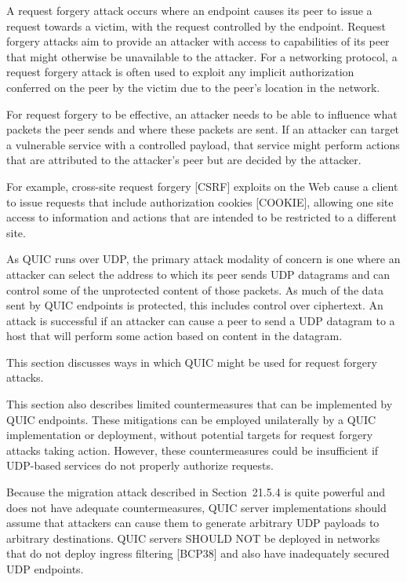 \documentclass{article}
\begin{document}
A request forgery attack occurs where an endpoint causes its peer to issue a request towards a victim, with the request controlled by the endpoint.  Request forgery attacks aim to provide an attacker with access to capabilities of its peer that might otherwise be unavailable to the attacker.  For a networking protocol, a request forgery attack is often used to exploit any implicit authorization conferred on the peer by the victim due to the peer's location in the network.

For request forgery to be effective, an attacker needs to be able to influence what packets the peer sends and where these packets are sent.  If an attacker can target a vulnerable service with a controlled payload, that service might perform actions that are attributed to the attacker's peer but are decided by the attacker.

For example, cross-site request forgery [CSRF] exploits on the Web cause a client to issue requests that include authorization cookies [COOKIE], allowing one site access to information and actions that are intended to be restricted to a different site.

As QUIC runs over UDP, the primary attack modality of concern is one where an attacker can select the address to which its peer sends UDP datagrams and can control some of the unprotected content of those packets.  As much of the data sent by QUIC endpoints is protected, this includes control over ciphertext.  An attack is successful if an attacker can cause a peer to send a UDP datagram to a host that will perform some action based on content in the datagram.

This section discusses ways in which QUIC might be used for request forgery attacks.

This section also describes limited countermeasures that can be implemented by QUIC endpoints.  These mitigations can be employed unilaterally by a QUIC implementation or deployment, without potential targets for request forgery attacks taking action. However, these countermeasures could be insufficient if UDP-based services do not properly authorize requests.

Because the migration attack described in Section~21.5.4 is quite powerful and does not have adequate countermeasures, QUIC server implementations should assume that attackers can cause them to generate arbitrary UDP payloads to arbitrary destinations.  QUIC servers SHOULD NOT be deployed in networks that do not deploy ingress filtering [BCP38] and also have inadequately secured UDP endpoints.
\end{document}
